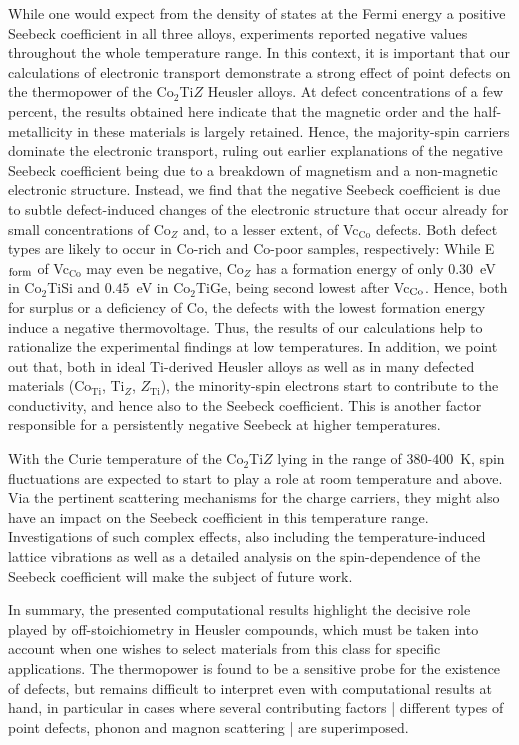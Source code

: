 \documentclass[aps,prb,twocolumn,superscriptaddress,showpacs]{revtex4}
\begin{document}
While one would expect from the density of states at the Fermi energy
a positive Seebeck coefficient in all three alloys, experiments
reported negative values throughout the whole
temperature range.\cite{BFB+10,BOG+10} 
In this context, it is important that our calculations of electronic
transport demonstrate a
strong effect of point defects on the thermopower of the Co$_2$Ti$Z$
Heusler alloys. At defect concentrations of a few percent, 
the results obtained here indicate that the magnetic order and the 
half-metallicity in these materials is largely retained. Hence, 
the majority-spin carriers dominate the electronic transport, 
ruling out earlier explanations of the negative Seebeck coefficient 
being due to a breakdown of magnetism and a non-magnetic electronic 
structure. Instead, we find that the negative Seebeck coefficient 
is due to subtle defect-induced changes of the electronic structure that
occur already for small concentrations of  Co$_Z$ and, 
to a lesser extent, of Vc$_\text{Co}$ defects. Both defect types are 
likely to occur in Co-rich and Co-poor samples, respectively: 
While E$_{\rm form}$ of Vc$_\text{Co}$ may even be negative,  
Co$_Z$ has a formation energy of only $0.30$~eV in Co$_2$TiSi and 
$0.45$~eV in Co$_2$TiGe, being second lowest after Vc$_{\rm Co}$. 
Hence, both for surplus or a deficiency of Co, the
defects with the lowest formation energy induce a negative
thermovoltage. Thus, the results of our calculations help to
rationalize  the experimental findings at low temperatures. In
addition, we point out that, both in ideal Ti-derived Heusler alloys
as well as in many defected materials (Co$_\text{Ti}$, Ti$_Z$,
$Z_\text{Ti}$), the minority-spin electrons start to contribute 
to the conductivity, and hence also to the Seebeck coefficient. 
This is another factor responsible for a persistently negative 
Seebeck at higher temperatures.

With the Curie temperature of the Co$_2$Ti$Z$ lying in the
range of $380$-$400$~K,\cite{BFB+10}
spin fluctuations are expected to start to play a role 
at room temperature and above. Via the pertinent 
scattering mechanisms for the charge carriers, 
they might also have an impact on the Seebeck coefficient in 
this temperature range. Investigations of such complex effects,
also including the temperature-induced lattice vibrations
as well as a detailed analysis on the spin-dependence of
the Seebeck coefficient will make the subject 
of future work. 

In summary, the presented computational results highlight the decisive
role played by off-stoichiometry in Heusler compounds, which must be
taken into account when one wishes to  select materials from this
class for specific applications. The thermopower is found to be a
sensitive probe for the existence of defects, but remains difficult to
interpret even with computational results at hand, in particular in
cases where several contributing factors | different types of point
defects, phonon and magnon scattering | are superimposed. 
\end{document}
